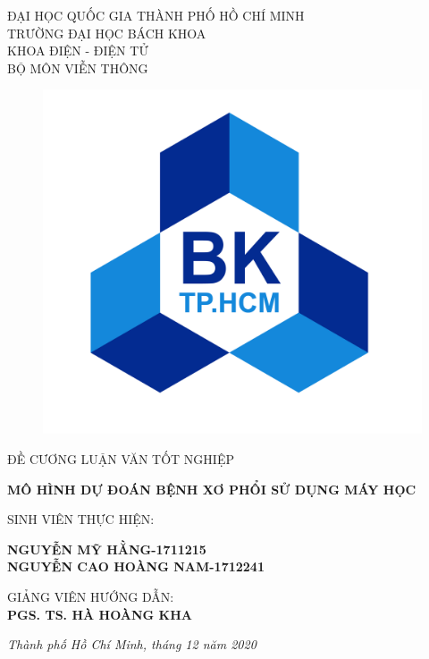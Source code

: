 \begin{titlepage}
\centering
{\large ĐẠI HỌC QUỐC GIA THÀNH PHỐ HỒ CHÍ MINH\\}
{\large TRƯỜNG ĐẠI HỌC BÁCH KHOA\\}
{\large KHOA ĐIỆN - ĐIỆN TỬ\\}
{\large BỘ MÔN VIỄN THÔNG\\}

\begin{figure}[h]
  \centerline{\includegraphics[scale=0.3]{images/Logo BK}}
\end{figure}

\vspace{0.3cm}

{\Large ĐỀ CƯƠNG LUẬN VĂN TỐT NGHIỆP}

\vspace{0.7cm}

{\LARGE\bfseries MÔ HÌNH DỰ ĐOÁN BỆNH XƠ PHỔI SỬ DỤNG MÁY HỌC }

\vspace{0.7cm}
{\large SINH VIÊN THỰC HIỆN:\\}

{\large\bfseries NGUYỄN MỸ HẰNG-1711215}
\\{\large\bfseries NGUYỄN CAO HOÀNG NAM-1712241}

\vspace{0.7cm}

{\large GIẢNG VIÊN HƯỚNG DẪN:\\}
{\large\bfseries PGS. TS. HÀ HOÀNG KHA}

\vfill

{\itshape Thành phố Hồ Chí Minh, tháng 12 năm 2020}
\end{titlepage}